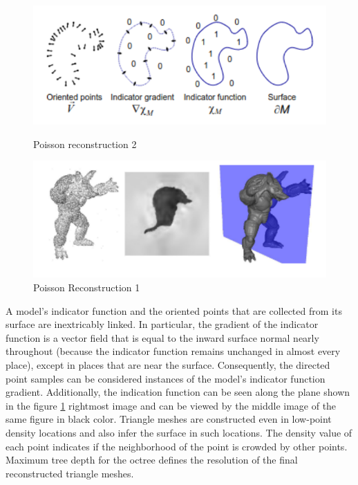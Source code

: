 \begin{figure}[htbp]
    \centering
    \begin{minipage}[b]{0.45\textwidth}
    \centering
    \includegraphics[width=1\linewidth]{97_graphics/related_work/poisson_reconstruction_2.pdf}
    \caption{Poisson reconstruction 2\parencite{kazhdan2006poisson} }
    \label{fig:related_work-poiss_rec_2}
    \end{minipage}
    \hfill
    \begin{minipage}[b]{0.45\textwidth}
    \centering
    \includegraphics[width=1\linewidth]{97_graphics/related_work/poisson_reconstruction_1.pdf}
    \caption{Poisson Reconstruction 1 \parencite{kazhdan2006poisson}}
    \label{fig:related_work-poiss_rec_1}
    \end{minipage}
\end{figure}

A model's indicator function and the oriented points that are collected from its surface are inextricably linked. In particular, the gradient of the indicator function is a vector field that is equal to the inward surface normal nearly throughout (because the indicator function remains unchanged in almost every place), except in places that are near the surface. Consequently, the directed point samples can be considered instances of the model's indicator function gradient. Additionally, the indication function can be seen along the plane shown in the figure \ref{fig:related_work-poiss_rec_1} rightmost image and can be viewed by the middle image of the same figure in black color. Triangle meshes are constructed even in low-point density locations and also infer the surface in such locations. The density value of each point indicates if the neighborhood of the point is crowded by other points. Maximum tree depth for the octree defines the resolution of the final reconstructed triangle meshes.

